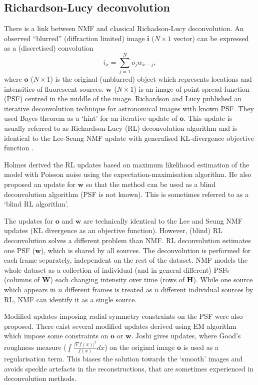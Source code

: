 
\subsection{Richardson-Lucy deconvolution \label{sub:RL deconvolution}}
There is a link between NMF and classical Richadson-Lucy deconvolution. An observed ``blurred'' (diffraction limited) image $\bm{i}$ ($N\times1$ vector) can be expressed as a (discretised) convolution 
%
\begin{equation} 
	i_x=\sum_{j=1}^{N}o_{j}w_{x-j}, 
\end{equation} 
%
where $\bm{o}$ ($N\times1$) is the original (unblurred) object which represents locations and intensities of fluorescent sources. $\bm{w}$ ($N\times1$) is an image of point spread function (PSF) centred in the middle of the image. Richardson \cite{Richardson1972} and Lucy \cite{Lucy1974} published an iterative deconvolution technique for astronomical images with known PSF. They used Bayes theorem as a `hint' for an iterative update of $\bm{o}$. This update is usually referred to as Richardson-Lucy (RL) deconvolution algorithm and is identical to the Lee-Seung NMF update with generalised KL-divergence objective function \cite{Lee2001}. 

Holmes \cite{Holmes:92} derived the RL updates based on maximum likelihood estimation of the model with Poisson noise using the expectation-maximisation algorithm. He also proposed an update for $\bm{w}$ so that the method can be used as a blind deconvolution algorithm (PSF is not known). This is sometimes referred to as a `blind RL algorithm'. 

The updates for $\bm{o}$ and $\bm{w}$ are technically identical to the Lee and Seung NMF updates (KL divergence as an objective function). However, (blind) RL deconvolution solves a different problem than NMF. RL deconvolution estimates one PSF ($\bm{w}$), which is shared by all sources. The deconvolution is performed for each frame separately, independent on the rest of the dataset. NMF models the whole dataset as a collection of individual (and in general different) PSFs (columns of $\bm{W}$) each changing intensity over time (rows of $\bm{H}$). While one source which appears in $n$ different frames is treated as $n$ different individual sources by RL, NMF can identify it as a single source. 

Modified updates imposing radial symmetry constraints on the PSF were also proposed. There exist several modified updates derived using EM algorithm which impose some constraints on $\bm{o}$ or $\bm{w}$. Joshi \cite{Joshi:93} gives updates, where Good's roughness measure ($\int\frac{\left|\nabla f(x)\right|^{2}}{f(x)}dx$) on the original image $\bm{o}$ is used as a regularisation term. This biases the solution towards the `smooth' images and avoids speckle artefacts in the reconstructions, that are sometimes experienced in deconvolution methods. 

